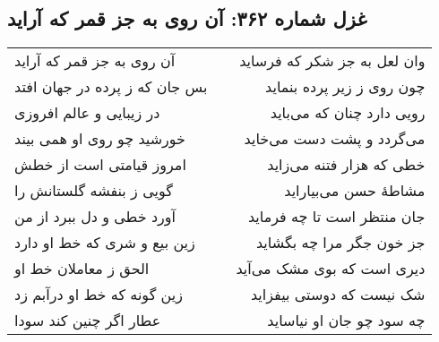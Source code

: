 \begin{center}
\section*{غزل شماره ۳۶۲: آن روی به جز قمر که آراید}
\label{sec:362}
\begin{longtable}{l p{0.5cm} r}
آن روی به جز قمر که آراید
&&
وان لعل به جز شکر که فرساید
\\
بس جان که ز پرده در جهان افتد
&&
چون روی ز زیر پرده بنماید
\\
در زیبایی و عالم افروزی
&&
رویی دارد چنان که می‌باید
\\
خورشید چو روی او همی بیند
&&
می‌گردد و پشت دست می‌خاید
\\
امروز قیامتی است از خطش
&&
خطی که هزار فتنه می‌زاید
\\
گویی ز بنفشه گلستانش را
&&
مشاطهٔ حسن می‌بیاراید
\\
آورد خطی و دل ببرد از من
&&
جان منتظر است تا چه فرماید
\\
زین بیع و شری که خط او دارد
&&
جز خون جگر مرا چه بگشاید
\\
الحق ز معاملان خط او
&&
دیری است که بوی مشک می‌آید
\\
زین گونه که خط او درآبم زد
&&
شک نیست که دوستی بیفزاید
\\
عطار اگر چنین کند سودا
&&
چه سود چو جان او نیاساید
\\
\end{longtable}
\end{center}
